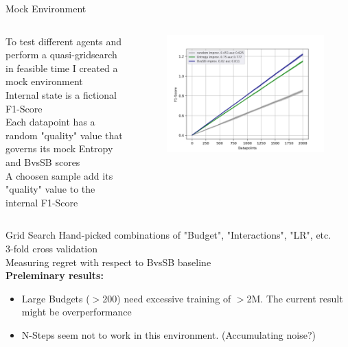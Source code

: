 \documentclass[aspectratio=169, 11pt, invertlogo]{ismll-slides}
\begin{document}


\begin{frame}[fragile]{Mock Environment}
	\begin{columns}
		\begin{column}{.6\linewidth}
			To test different agents and perform a quasi-gridsearch in feasible time I created a mock environment \\ [1mm]
			Internal state is a fictional F1-Score \\ [1mm]
			Each datapoint has a random "quality" value that governs its mock Entropy and BvsSB scores \\ [1mm]
			A choosen sample add its "quality" value to the internal F1-Score 
		\end{column}
		\begin{column}{.4\linewidth}
			\begin{figure}
				\centering
				\includegraphics[width=\linewidth]{pics/eval_mock}
			\end{figure}
		\end{column}
	\end{columns}
\end{frame}




\begin{frame}[fragile]{Grid Search}
	Hand-picked combinations of "Budget", "Interactions", "LR", etc. \\ [1mm]
	3-fold cross validation \\ [1mm]
	Measuring regret with respect to BvsSB baseline \\ [1mm]
	\textbf{Preleminary results:}
	\begin{itemize}
		\item Large Budgets ($>$200) need excessive training of $>$2M. The current result might be overperformance
		\item N-Steps seem not to work in this environment. (Accumulating noise?)
		
	\end{itemize}
\end{frame}
\end{document}
